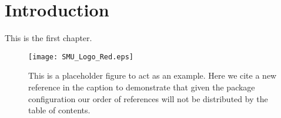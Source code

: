 \chapter{Introduction}\label{chapter:introduction}

This is the first chapter.~\cite{Aaboud:2016mmw,Bruning:782076}

\begin{figure}[htpb]
 \centering
 \texttt{[image: SMU\_Logo\_Red.eps]}
 \caption{This is a placeholder figure to act as an example.
  Here we cite a new reference in the caption to demonstrate that given the package configuration our order of references will not be distributed by the table of contents.~\cite{Higgs:1964ia}}
 \label{fig:test_figure}
\end{figure}
